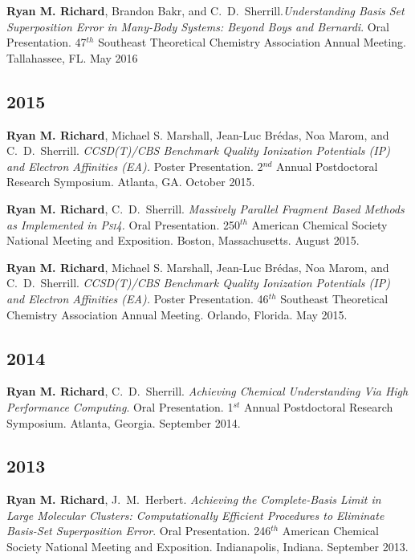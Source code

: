 \documentclass[11pt,a4paper,sans]{moderncv}
\begin{document}
\begin{etaremune}
	\item{\textbf{Ryan M. Richard}, Brandon Bakr, and C.~D.~Sherrill.\textit{Understanding Basis Set Superposition Error in Many-Body Systems: Beyond Boys and Bernardi}.  Oral Presentation.  47$^{th}$  Southeast Theoretical Chemistry Association Annual Meeting.  Tallahassee, FL. May 2016}

	\subsection{2015}

	\item{\textbf{Ryan M. Richard}, Michael S. Marshall, Jean-Luc Br{\' e}das, Noa Marom, and C.~D.~Sherrill. {\em CCSD(T)/CBS Benchmark Quality Ionization Potentials (IP) and Electron Affinities (EA).} Poster Presentation.  2$^{nd}$ Annual Postdoctoral Research Symposium.  Atlanta, GA. October 2015.}

	\item{\textbf{Ryan M. Richard}, C.~D.~Sherrill.  {\em Massively Parallel Fragment Based Methods as Implemented in \textsc{Psi4}.} Oral Presentation.  250$^{th}$ American Chemical Society National Meeting and Exposition. Boston, Massachusetts. August 2015.}

	\item{\textbf{Ryan M. Richard}, Michael S. Marshall, Jean-Luc Br{\' e}das, Noa Marom, and C.~D.~Sherrill. {\em CCSD(T)/CBS Benchmark Quality Ionization Potentials (IP) and Electron Affinities (EA).} Poster Presentation.  46$^{th}$ Southeast Theoretical Chemistry Association Annual Meeting.  Orlando, Florida. May 2015.}

	\subsection{2014}

	\item{\textbf{Ryan M. Richard}, C.~D.~Sherrill. {\em Achieving Chemical Understanding Via High Performance Computing}. Oral Presentation. 1$^{st}$ Annual Postdoctoral Research Symposium.  Atlanta, Georgia.  September 2014.}

	\subsection{2013}

	\item{\textbf{Ryan M. Richard}, J.~M.~Herbert.  {\em Achieving the Complete-Basis Limit in Large Molecular Clusters: Computationally Efficient Procedures to Eliminate Basis-Set Superposition Error}.  Oral Presentation.  246$^{th}$ American Chemical Society National Meeting and Exposition.  Indianapolis, Indiana.  September 2013.}


\end{etaremune}
\end{document}

